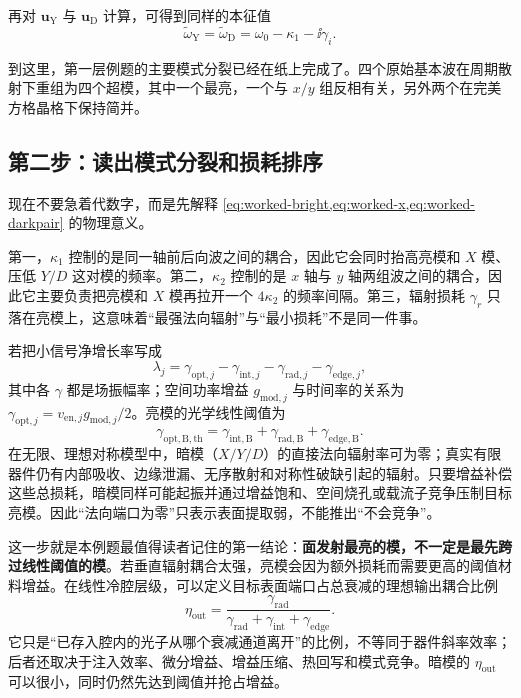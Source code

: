再对 $\bm{u}_{\mathrm{Y}}$ 与 $\bm{u}_{\mathrm{D}}$ 计算，可得到同样的本征值
\begin{equation}
\tilde{\omega}_{\mathrm{Y}}
=
\tilde{\omega}_{\mathrm{D}}
=
\omega_0-\kappa_1-\ii\gamma_i.
\label{eq:worked-darkpair}
\end{equation}

到这里，第一层例题的主要模式分裂已经在纸上完成了。四个原始基本波在周期散射下重组为四个超模，其中一个最亮，一个与 $x/y$ 组反相有关，另外两个在完美方格晶格下保持简并。

\subsection{第二步：读出模式分裂和损耗排序}
现在不要急着代数字，而是先解释 \cref{eq:worked-bright,eq:worked-x,eq:worked-darkpair} 的物理意义。

第一，$\kappa_1$ 控制的是同一轴前后向波之间的耦合，因此它会同时抬高亮模和 $X$ 模、压低 $Y/D$ 这对模的频率。第二，$\kappa_2$ 控制的是 $x$ 轴与 $y$ 轴两组波之间的耦合，因此它主要负责把亮模和 $X$ 模再拉开一个 $4\kappa_2$ 的频率间隔。第三，辐射损耗 $\gamma_r$ 只落在亮模上，这意味着“最强法向辐射”与“最小损耗”不是同一件事。

若把小信号净增长率写成
\begin{equation}
\lambda_j = \gamma_{\mathrm{opt},j}-\gamma_{\mathrm{int},j}-\gamma_{\mathrm{rad},j}-\gamma_{\mathrm{edge},j},
\label{eq:worked-lambda}
\end{equation}
其中各 $\gamma$ 都是场振幅率；空间功率增益 $g_{\mathrm{mod},j}$ 与时间率的关系为 $\gamma_{\mathrm{opt},j}=v_{\mathrm{en},j}g_{\mathrm{mod},j}/2$。亮模的光学线性阈值为
\begin{equation}
\gamma_{\mathrm{opt,B,th}}
=\gamma_{\mathrm{int,B}}+\gamma_{\mathrm{rad,B}}+\gamma_{\mathrm{edge,B}}.
\label{eq:worked-thresholds-bright}
\end{equation}
在无限、理想对称模型中，暗模（$X/Y/D$）的直接法向辐射率可为零；真实有限器件仍有内部吸收、边缘泄漏、无序散射和对称性破缺引起的辐射。只要增益补偿这些总损耗，暗模同样可能起振并通过增益饱和、空间烧孔或载流子竞争压制目标亮模。因此“法向端口为零”只表示表面提取弱，不能推出“不会竞争”。

这一步就是本例题最值得读者记住的第一结论：\textbf{面发射最亮的模，不一定是最先跨过线性阈值的模}。若垂直辐射耦合太强，亮模会因为额外损耗而需要更高的阈值材料增益。在线性冷腔层级，可以定义目标表面端口占总衰减的理想输出耦合比例
\begin{equation}
\eta_{\mathrm{out}}
=
\frac{\gamma_{\mathrm{rad}}}
{\gamma_{\mathrm{rad}}+\gamma_{\mathrm{int}}+\gamma_{\mathrm{edge}}}.
\label{eq:worked-slope-efficiency}
\end{equation}
它只是“已存入腔内的光子从哪个衰减通道离开”的比例，不等同于器件斜率效率；后者还取决于注入效率、微分增益、增益压缩、热回写和模式竞争。暗模的 $\eta_{\mathrm{out}}$ 可以很小，同时仍然先达到阈值并抢占增益。

